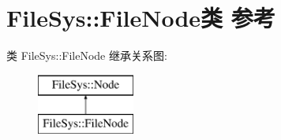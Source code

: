\hypertarget{class_file_sys_1_1_file_node}{\section{File\-Sys\-:\-:File\-Node类 参考}
\label{class_file_sys_1_1_file_node}
}
类 File\-Sys\-:\-:File\-Node 继承关系图\-:\begin{figure}[H]
\begin{center}
\leavevmode
\includegraphics[height=2.000000cm]{class_file_sys_1_1_file_node}
\end{center}
\end{figure}
